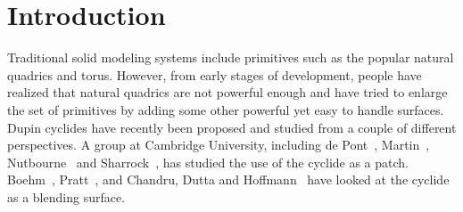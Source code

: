 
\section{Introduction}
\label{section:cyclide-intro}

     Traditional solid modeling systems include primitives such as the popular
natural quadrics and torus. However, from
early stages of development, people have realized that natural
quadrics are not powerful enough and have tried to enlarge the set of 
primitives by adding some other powerful yet easy to handle surfaces.
Dupin cyclides have recently been proposed and studied from a couple of 
different perspectives.  A group at Cambridge University, including 
de Pont~\cite{depont:1984},
Martin~\cite{martin:1982}, 
Nutbourne~\cite{nutbourne-martin:1988} and 
Sharrock~\cite{sharrock:1985}, has 
studied the use of the cyclide as a patch.  
Boehm~\cite{boehm:1990},
Pratt~\cite{pratt:1990}, and 
Chandru, Dutta and 
Hoffmann~\cite{chandru-dutta-hoffmann:1990} 
have looked at the cyclide as a
blending surface.

